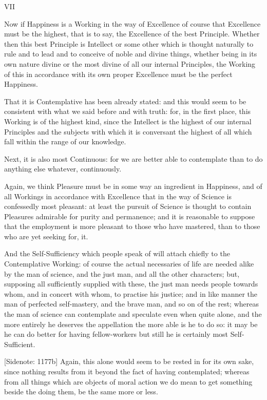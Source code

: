 VII

Now if Happiness is a Working in the way of Excellence of course that
Excellence must be the highest, that is to say, the Excellence of the
best Principle. Whether then this best Principle is Intellect or some
other which is thought naturally to rule and to lead and to conceive of
noble and divine things, whether being in its own nature divine or the
most divine of all our internal Principles, the Working of this in
accordance with its own proper Excellence must be the perfect Happiness.

That it is Contemplative has been already stated: and this would seem to
be consistent with what we said before and with truth: for, in the first
place, this Working is of the highest kind, since the Intellect is the
highest of our internal Principles and the subjects with which it
is conversant the highest of all which fall within the range of our
knowledge.

Next, it is also most Continuous: for we are better able to contemplate
than to do anything else whatever, continuously.

Again, we think Pleasure must be in some way an ingredient in Happiness,
and of all Workings in accordance with Excellence that in the way of
Science is confessedly most pleasant: at least the pursuit of Science is
thought to contain Pleasures admirable for purity and permanence; and it
is reasonable to suppose that the employment is more pleasant to those
who have mastered, than to those who are yet seeking for, it.

And the Self-Sufficiency which people speak of will attach chiefly to
the Contemplative Working: of course the actual necessaries of life are
needed alike by the man of science, and the just man, and all the other
characters; but, supposing all sufficiently supplied with these, the
just man needs people towards whom, and in concert with whom, to
practise his justice; and in like manner the man of perfected
self-mastery, and the brave man, and so on of the rest; whereas the man
of science can contemplate and speculate even when quite alone, and the
more entirely he deserves the appellation the more able is he to do so:
it may be he can do better for having fellow-workers but still he is
certainly most Self-Sufficient.

[Sidenote: 1177b] Again, this alone would seem to be rested in for
its own sake, since nothing results from it beyond the fact of having
contemplated; whereas from all things which are objects of moral action
we do mean to get something beside the doing them, be the same more or
less.

